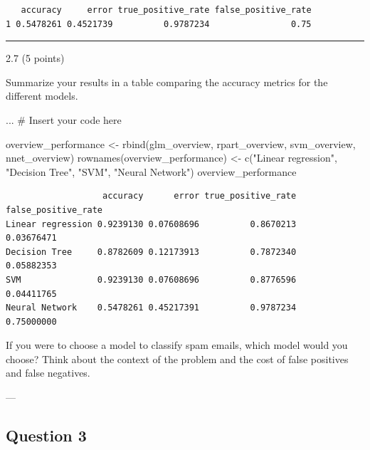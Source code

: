 \documentclass[
  letterpaper,
  DIV=11,
  numbers=noendperiod]{scrartcl}
\newenvironment{Shaded}{\begin{snugshade}}{\end{snugshade}}
\newcommand{\CommentTok}[1]{\textcolor[rgb]{0.37,0.37,0.37}{#1}}
\newcommand{\FunctionTok}[1]{\textcolor[rgb]{0.28,0.35,0.67}{#1}}
\newcommand{\NormalTok}[1]{\textcolor[rgb]{0.00,0.23,0.31}{#1}}
\newcommand{\OtherTok}[1]{\textcolor[rgb]{0.00,0.23,0.31}{#1}}
\newcommand{\StringTok}[1]{\textcolor[rgb]{0.13,0.47,0.30}{#1}}
\begin{document}
\begin{verbatim}
   accuracy     error true_positive_rate false_positive_rate
1 0.5478261 0.4521739          0.9787234                0.75
\end{verbatim}

\begin{center}\rule{0.5\linewidth}{0.5pt}\end{center}

2.7 (5 points)

Summarize your results in a table comparing the accuracy metrics for the
different models.

\begin{Shaded}
\begin{Highlighting}[]
\NormalTok{... }\CommentTok{\# Insert your code here}
\end{Highlighting}
\end{Shaded}

\begin{Shaded}
\begin{Highlighting}[]
\NormalTok{overview\_performance }\OtherTok{\textless{}{-}} \FunctionTok{rbind}\NormalTok{(glm\_overview, rpart\_overview, svm\_overview, nnet\_overview)}
\FunctionTok{rownames}\NormalTok{(overview\_performance) }\OtherTok{\textless{}{-}} \FunctionTok{c}\NormalTok{(}\StringTok{"Linear regression"}\NormalTok{, }\StringTok{"Decision Tree"}\NormalTok{, }\StringTok{"SVM"}\NormalTok{, }\StringTok{"Neural Network"}\NormalTok{)}
\NormalTok{overview\_performance}
\end{Highlighting}
\end{Shaded}

\begin{verbatim}
                   accuracy      error true_positive_rate false_positive_rate
Linear regression 0.9239130 0.07608696          0.8670213          0.03676471
Decision Tree     0.8782609 0.12173913          0.7872340          0.05882353
SVM               0.9239130 0.07608696          0.8776596          0.04411765
Neural Network    0.5478261 0.45217391          0.9787234          0.75000000
\end{verbatim}

If you were to choose a model to classify spam emails, which model would
you choose? Think about the context of the problem and the cost of false
positives and false negatives.

---

\hypertarget{question-3}{%
\subsection{Question 3}\label{question-3}}
\end{document}
